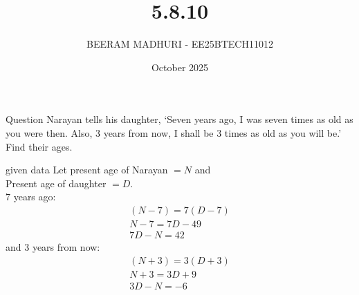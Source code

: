 \documentclass{beamer}
\title %
{5.8.10}
\date{October  2025}
\author %
{BEERAM MADHURI - EE25BTECH11012}
\begin{document}
\frame{\titlepage}
\begin{frame}{Question}
Narayan tells his daughter, `Seven years ago, I was seven times as old as you were then. Also, 3 years from now, I shall be 3 times as old as you will be.' Find their ages.
\end{frame}
 
\begin{frame}{given data}
 Let present age of Narayan $= N$ and \\
Present age of daughter $= D$. \\
7 years ago: 
\begin{align}
(N-7) = 7(D-7) \\
N-7 = 7D -49 \\
7D-N = 42
\end{align}
and 3 years from now: 
\begin{align}
(N+3) = 3(D+3) \\
N+3 = 3D +9\\
3D-N = -6 
\end{align}
\end{frame}
\end{document}
